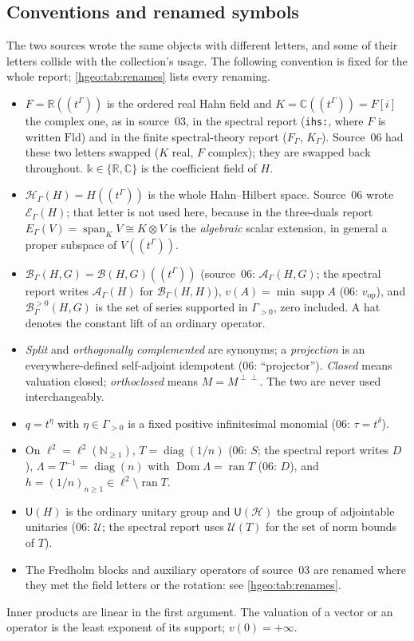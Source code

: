 \documentclass[11pt,letterpaper]{article}
\numberwithin{equation}{section}
\theoremstyle{definition}
\theoremstyle{remark}
\newcommand{\R}{\mathbb R}
\newcommand{\C}{\mathbb C}
\newcommand{\N}{\mathbb N}
\newcommand{\kk}{\mathbb k}
\newcommand{\F}{F}
\newcommand{\K}{K}
\newcommand{\HH}[1]{\mathscr H_\Gamma(#1)}
\newcommand{\BB}[2]{\mathscr B_\Gamma(#1,#2)}
\newcommand{\BH}{\mathscr B_\Gamma(H,H)}
\newcommand{\Bpos}[2]{\mathscr B^{>0}_\Gamma(#1,#2)}
\newcommand{\supp}{\operatorname{supp}}
\newcommand{\ran}{\operatorname{ran}}
\newcommand{\Dom}{\operatorname{Dom}}
\newcommand{\Span}{\operatorname{span}}
\newcommand{\diag}{\operatorname{diag}}
\newcommand{\Un}{\mathsf U}
\newcommand{\cH}{\mathcal H}
\newcommand{\replabel}[1]{\nolinkurl{#1}}
\begin{document}
\subsection{Conventions and renamed symbols}\label{hgeo:sub:conventions}
The two sources wrote the same objects with different letters, and some of
their letters collide with the collection's usage. The following convention
is fixed for the whole report; \cref{hgeo:tab:renames} lists every renaming.
\begin{itemize}
\item $\F=\R((t^\Gamma))$ is the ordered real Hahn field and
$\K=\C((t^\Gamma))=\F[i]$ the complex one, as in source~03, in the spectral
report (\replabel{ihs:}, where $\F$ is written $\mathrm{Fld}$) and in the
finite spectral-theory report ($F_\Gamma$, $K_\Gamma$). Source~06 had these
two letters swapped ($K$ real, $F$ complex); they are swapped back
throughout. $\kk\in\{\R,\C\}$ is the coefficient field of $H$.
\item $\HH{H}=H((t^\Gamma))$ is the whole Hahn--Hilbert space. Source~06
wrote $\mathcal E_\Gamma(H)$; that letter is not used here, because in
the three-duals report $E_\Gamma(V)=\Span_\K V\cong\K\otimes V$ is the
\emph{algebraic} scalar extension, in general a proper subspace of
$V((t^\Gamma))$.
\item $\BB{H}{G}=\mathcal B(H,G)((t^\Gamma))$ (source~06:
$\mathcal A_\Gamma(H,G)$; the spectral report writes $\mathcal A_\Gamma(H)$
for $\BH$), $v(A)=\min\supp A$ (06: $v_{\mathrm{op}}$), and
$\Bpos{H}{G}$ is the set of series supported in $\Gamma_{>0}$, zero
included. A hat denotes the constant lift of an ordinary operator.
\item \emph{Split} and \emph{orthogonally complemented} are synonyms; a
\emph{projection} is an everywhere-defined self-adjoint idempotent (06:
``projector''). \emph{Closed} means valuation closed; \emph{orthoclosed}
means $M=M^{\perp\perp}$. The two are never used interchangeably.
\item $q=t^\eta$ with $\eta\in\Gamma_{>0}$ is a fixed positive
infinitesimal monomial (06: $\tau=t^\delta$).
\item On $\ell^2=\ell^2(\N_{\ge1})$, $T=\diag(1/n)$ (06: $S$; the spectral
report writes $D$), $\Lambda=T^{-1}=\diag(n)$ with $\Dom\Lambda=\ran T$
(06: $D$), and $h=(1/n)_{n\ge1}\in\ell^2\setminus\ran T$.
\item $\Un(H)$ is the ordinary unitary group and $\Un(\cH)$ the group of
adjointable unitaries (06: $\mathcal U$; the spectral report uses
$\mathcal U(T)$ for the set of norm bounds of $T$).
\item The Fredholm blocks and auxiliary operators of source~03 are renamed
where they met the field letters or the rotation: see
\cref{hgeo:tab:renames}.
\end{itemize}
Inner products are linear in the first argument. The valuation of a vector
or an operator is the least exponent of its support; $v(0)=+\infty$.
\end{document}
